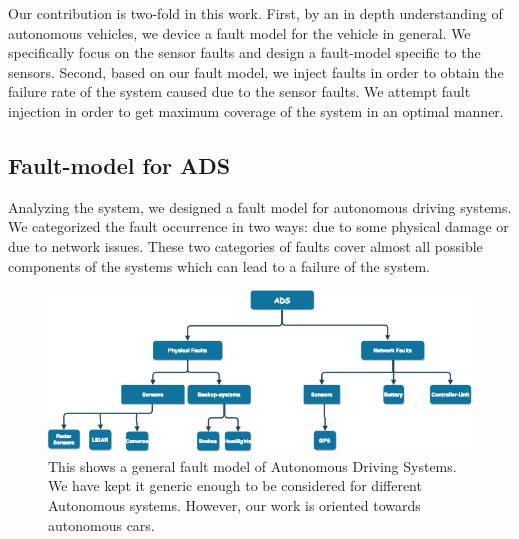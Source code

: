 

Our contribution is two-fold in this work. First, by an in depth understanding of autonomous vehicles, we device a fault model for the vehicle in general. We specifically focus on the sensor faults and design a fault-model specific to the sensors. Second, based on our fault model, we inject faults in order to obtain the failure rate of the system caused due to the sensor faults. We attempt fault injection in order to get maximum coverage of the system in an optimal manner.

\subsection{Fault-model for ADS}
Analyzing the system, we designed a fault model for autonomous driving systems. We categorized the fault occurrence in two ways: due to some physical damage or due to network issues. These two categories of faults cover almost all possible components of the systems which can lead to a failure of the system. 

\begin{figure}
	\centering
	\includegraphics[width=1.0\linewidth]{Fault-model1}
	\caption[Fault-model for ADS]{This shows a general fault model of Autonomous Driving Systems. We have kept it generic enough to be considered for different Autonomous systems. However, our work is oriented towards autonomous cars.}
	\label{fig:fault-model1}
\end{figure}

